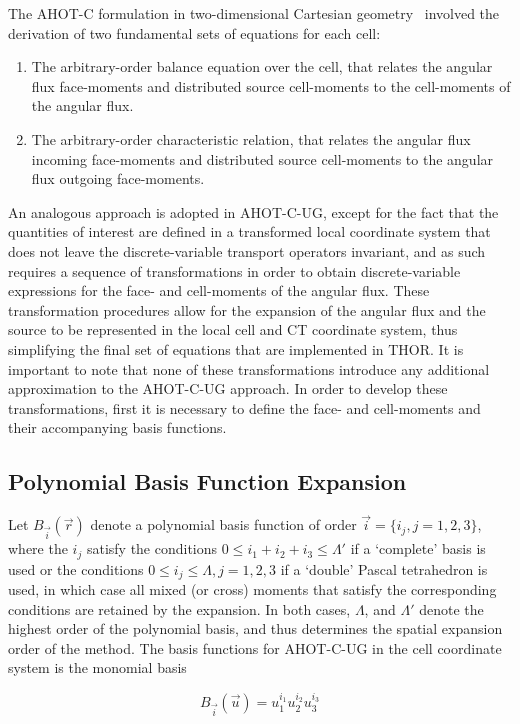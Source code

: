 The AHOT-C formulation in two-dimensional Cartesian geometry~\cite{Azmy1992} involved the derivation of two fundamental sets of equations for each cell:
\begin{enumerate}
    \item The arbitrary-order balance equation over the cell, that relates the angular flux face-moments and distributed source cell-moments to the cell-moments of the angular flux.
    \item The arbitrary-order characteristic relation, that relates the angular flux incoming face-moments and distributed source cell-moments to the angular flux outgoing face-moments.
\end{enumerate}
An analogous approach is adopted in AHOT-C-UG, except for the fact that the quantities of interest are defined in a transformed local coordinate system that does not leave the discrete-variable transport operators invariant, and as such requires a sequence of transformations in order to obtain discrete-variable expressions for the face- and cell-moments of the angular flux. These transformation procedures allow for the expansion of the angular flux and the source to be represented in the local cell and CT coordinate system, thus simplifying the final set of equations that are implemented in THOR. It is important to note that none of these transformations introduce any additional approximation to the AHOT-C-UG approach.
In order to develop these transformations, first it is necessary to define the face- and cell-moments and their accompanying basis functions.

\subsection{Polynomial Basis Function Expansion}

Let $B_{\vec{i}} (\vec{r})$ denote a polynomial basis function of order $\vec{i} = \{ i_j,j=1,2,3 \}$, where the $i_j$ satisfy the conditions $0 \leq i_1 + i_2 + i_3 \leq \Lambda '$ if a ‘complete’ basis is used or the conditions $0 \leq i_j \leq \Lambda , j = 1, 2, 3$ if a ‘double’ Pascal tetrahedron is used, in which case all mixed (or cross) moments that satisfy the corresponding conditions are retained by the expansion. In both cases, $\Lambda$, and $\Lambda '$ denote the highest order of the polynomial basis, and thus determines the spatial expansion order of the method. The basis functions for AHOT-C-UG in the cell coordinate system is the monomial basis
 
\begin{equation} \label{eq:cell_basis}
    B_{\vec{i}} (\vec{u}) = u_1^{i_1} u_2^{i_2} u_3^{i_3}
\end{equation}

